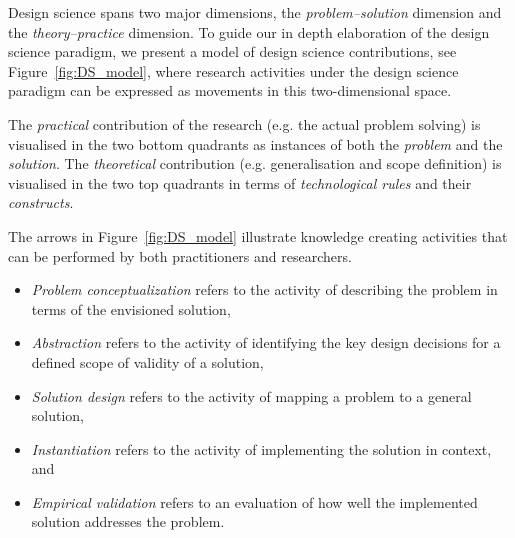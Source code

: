 \documentclass[graybox]{svmult}
\begin{document}

Design science spans two major dimensions, the \emph{problem--solution} dimension and the \emph{theory--practice} dimension. To guide our in depth elaboration of the design science paradigm, we present a model of design science contributions, see Figure~\ref{fig:DS_model}, where research activities under the design science paradigm can be expressed as movements in this two-dimensional space.

The \emph{practical} contribution of the research (e.g. the actual problem solving) is visualised in the two bottom quadrants as instances of both the \emph{problem} and the \emph{solution}. The \emph{theoretical} contribution (e.g. generalisation and scope definition) is visualised in the two top quadrants in terms of \emph{technological rules} and their \emph{constructs}. 

The arrows in Figure~\ref{fig:DS_model} illustrate knowledge creating activities that can be performed by both practitioners and researchers. 
\begin{itemize}
\item \emph{Problem conceptualization} refers to the activity of describing the problem in terms of the envisioned solution, 
\item \emph{Abstraction} refers to the activity of identifying the key design decisions for a defined scope of validity of a solution, 
\item \emph{Solution design} refers to the activity of mapping a problem to a general solution, \item \emph{Instantiation} refers to the activity of implementing the solution in context, and  \item \emph{Empirical validation} refers to an evaluation of how well the implemented solution addresses the problem.
\end{itemize}
\end{document}
